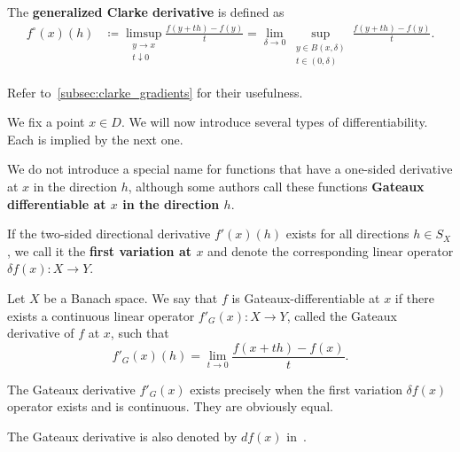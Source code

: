 \begin{definition}
\begin{defenum}
    \cite[section 10.1]{Clarke2013} The \textbf{generalized Clarke derivative} is defined as
    \begin{align*}
      f^\circ(x)(h)
      &\coloneqq
      \limsup_{\substack{y \to x \\ t \downarrow 0}} \frac {f(y + th) - f(y)} t
      =
      \lim_{\delta \to 0} \sup_{\substack{y \in B(x, \delta) \\ t \in (0, \delta)}} \frac {f(y + th) - f(y)} t.
    \end{align*}

    Refer to~\cref{subsec:clarke_gradients} for their usefulness.
  \end{defenum}
\end{definition}

\begin{definition}\label{def:differentiability}
  We fix a point \( x \in D \). We will now introduce several types of differentiability. Each is implied by the next one.

  \begin{defenum}
    \item We do not introduce a special name for functions that have a one-sided derivative at \( x \) in the direction \( h \), although some authors call these functions \textbf{Gateaux differentiable at \( x \) in the direction \( h \)}. %

    \cite[0.2.1]{Ioffe1974} If the two-sided directional derivative \( f'(x)(h) \) exists for all directions \( h \in S_X \), we call it the \textbf{first variation at \( x \)} and denote the corresponding linear operator \( \delta f(x): X \to Y \).

    \cite[definition 1.12]{Phelps1993} Let \( X \) be a Banach space. We say that \( f \) is Gateaux-differentiable at \( x \) if there exists a continuous linear operator \( f'_G(x): X \to Y \), called the Gateaux derivative of \( f \) at \( x \), such that
    \begin{equation*}
      f'_G(x)(h) = \lim_{t \to 0} \frac {f(x + th) - f(x)} t.
    \end{equation*}

    The Gateaux derivative \( f'_G(x) \) exists precisely when the first variation \( \delta f(x) \) operator exists and is continuous. They are obviously equal.

    The Gateaux derivative is also denoted by \( df(x) \) in~\cite[definition 1.12]{Phelps1993}.


\end{defenum}
\end{definition}
